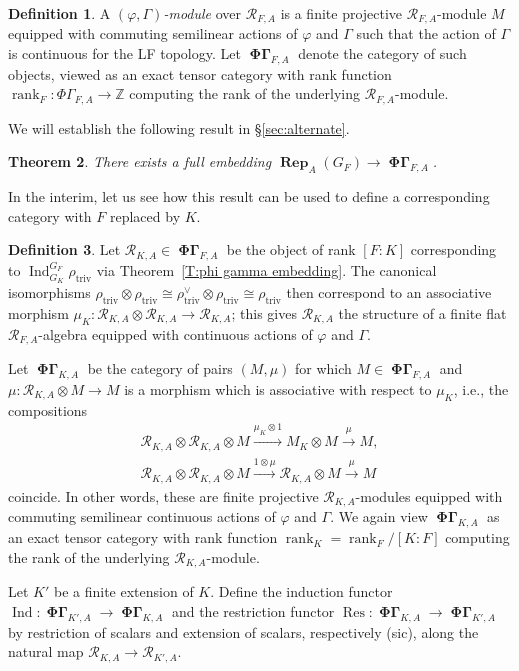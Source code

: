 \documentclass[12pt]{amsart}
\newtheorem{theorem}{Theorem}[section]
\theoremstyle{definition}
\newtheorem{defn}[theorem]{Definition}
\numberwithin{equation}{theorem}
\newcommand{\ZZ}{\mathbb{Z}}
\newcommand{\calR}{\mathcal{R}}
\newcommand{\dual}{\vee}
\DeclareMathOperator{\Ind}{Ind}
\DeclareMathOperator{\PhiGamma}{\mathbf{\Phi \Gamma}}
\DeclareMathOperator{\rank}{rank}
\DeclareMathOperator{\Rep}{\mathbf{Rep}}
\DeclareMathOperator{\Res}{Res}
\DeclareMathOperator{\triv}{triv}
\begin{document}
\begin{defn}
A \emph{$(\varphi, \Gamma)$-module} over $\calR_{F,A}$ is a finite projective $\calR_{F,A}$-module $M$ equipped with commuting semilinear actions of $\varphi$ and $\Gamma$ such that the action of $\Gamma$ is continuous for the LF topology. Let $\PhiGamma_{F,A}$ denote the category of such objects, viewed as an exact tensor category
with rank function $\rank_F: \Phi\Gamma_{F,A} \to \ZZ$ computing the rank of the underlying $\calR_{F,A}$-module.
\end{defn}

We will establish the following result in \S\ref{sec:alternate}.
\begin{theorem} \label{T:phi gamma embedding1}
There exists a full embedding $\Rep_A(G_F) \to \PhiGamma_{F,A}$.
\end{theorem}
In the interim, let us see how this result can be used to define a corresponding category with $F$ replaced by $K$.

\begin{defn}
Let $\calR_{K,A} \in \PhiGamma_{F,A}$ be the object of rank $[F:K]$ corresponding to $\Ind^{G_F}_{G_K} \rho_{\triv}$ via Theorem~\ref{T:phi gamma embedding}. The canonical isomorphisms $\rho_{\triv} \otimes \rho_{\triv} \cong \rho_{\triv}^\dual \otimes \rho_{\triv} \cong \rho_{\triv}$
then correspond to an associative morphism $\mu_K: \calR_{K,A} \otimes \calR_{K,A} \to \calR_{K,A}$; this gives $\calR_{K,A}$ the structure of a finite flat $\calR_{F,A}$-algebra equipped with continuous actions of $\varphi$ and $\Gamma$.

Let $\PhiGamma_{K,A}$ be the category of pairs $(M, \mu)$ for which $M \in \PhiGamma_{F,A}$
and $\mu: \calR_{K,A} \otimes M \to M$ is a morphism which is associative with respect to $\mu_K$, i.e., the compositions
\begin{gather*}
\calR_{K,A} \otimes \calR_{K,A}  \otimes M \stackrel{\mu_K \otimes 1}{\to} M_K \otimes M \stackrel{\mu}{\to} M, \\
\calR_{K,A} \otimes \calR_{K,A} \otimes M \stackrel{1 \otimes \mu}{\to} \calR_{K,A} \otimes  M \stackrel{\mu}{\to} M
\end{gather*}
coincide. 
In other words, these are finite projective $\calR_{K,A}$-modules equipped with commuting semilinear continuous actions of $\varphi$ and $\Gamma$.
We again view $\PhiGamma_{K,A}$ as an exact tensor category with rank function $\rank_K = \rank_F / [K:F]$ computing the rank of the underlying $\calR_{K,A}$-module.

Let $K'$ be a finite extension of $K$. Define the induction functor
$\Ind: \PhiGamma_{K',A} \to \PhiGamma_{K,A}$ 
and the restriction functor $\Res: \PhiGamma_{K,A} \to \PhiGamma_{K',A}$
by restriction of scalars and extension of scalars, respectively (sic), along the natural map $\calR_{K,A}  \to \calR_{K',A}$.
\end{defn}
\end{document}
